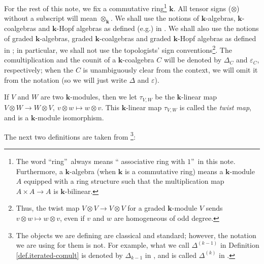 \documentclass
[numbers=enddot,12pt,final,onecolumn,notitlepage,abstracton]{scrartcl}%
\theoremstyle{definition}
\begin{document}
For the rest of this note, we fix a commutative ring\footnote{The word
\textquotedblleft ring\textquotedblright\ always means \textquotedblleft
associative ring with $1$\textquotedblright\ in this note. Furthermore, a
$\mathbf{k}$-algebra (when $\mathbf{k}$ is a commutative ring) means a
$\mathbf{k}$-module $A$ equipped with a ring structure such that the
multiplication map $A\times A\rightarrow A$ is $\mathbf{k}$-bilinear.}
$\mathbf{k}$. All tensor signs ($\otimes$) without a subscript will mean
$\otimes_{\mathbf{k}}$. We shall use the notions of $\mathbf{k}$-algebras,
$\mathbf{k}$-coalgebras and $\mathbf{k}$-Hopf algebras as defined (e.g.) in
\cite[Chapter 1]{Reiner}. We shall also use the notions of graded $\mathbf{k}%
$-algebras, graded $\mathbf{k}$-coalgebras and graded $\mathbf{k}$-Hopf
algebras as defined in \cite[Chapter 1]{Reiner}; in particular, we shall not
use the topologists' sign conventions\footnote{Thus, the twist map $V\otimes
V\rightarrow V\otimes V$ for a graded $\mathbf{k}$-module $V$ sends $v\otimes
w\mapsto w\otimes v$, even if $v$ and $w$ are homogeneous of odd degree.}. The
comultiplication and the counit of a $\mathbf{k}$-coalgebra $C$ will be
denoted by $\Delta_{C}$ and $\varepsilon_{C}$, respectively; when the $C$ is
unambiguously clear from the context, we will omit it from the notation (so we
will just write $\Delta$ and $\varepsilon$).

If $V$ and $W$ are two $\mathbf{k}$-modules, then we let $\tau_{V,W}$ be the
$\mathbf{k}$-linear map $V\otimes W\rightarrow W\otimes V,\ v\otimes w\mapsto
w\otimes v$. This $\mathbf{k}$-linear map $\tau_{V,W}$ is called the
\textit{twist map}, and is a $\mathbf{k}$-module isomorphism.

The next two definitions are taken from \cite[\S 1.4]{Reiner}\footnote{The
objects we are defining are classical and standard; however, the notation we
are using for them is not. For example, what we call $\Delta^{\left(
k-1\right)  }$ in Definition \ref{def.iterated-comult} is denoted by
$\Delta_{k-1}$ in \cite{Sweedler-HA}, and is called $\Delta^{\left(  k\right)
}$ in \cite[\S 7.1]{Fresse-Op}.}:
\end{document}
